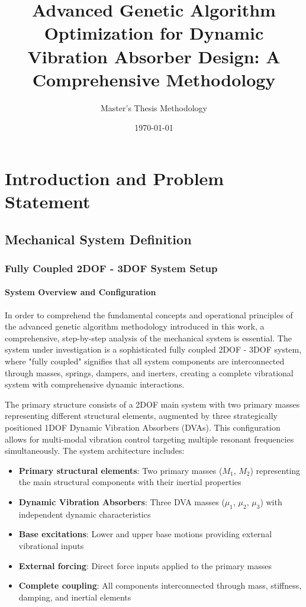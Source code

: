 \documentclass[12pt,a4paper]{article}
\title{Advanced Genetic Algorithm Optimization for Dynamic Vibration Absorber Design: A Comprehensive Methodology}
\author{Master's Thesis Methodology}
\date{\today}
\begin{document}
\maketitle

\tableofcontents
\newpage

\section{Introduction and Problem Statement}

\subsection{Mechanical System Definition}

\subsubsection{Fully Coupled 2DOF - 3DOF System Setup}
\paragraph{System Overview and Configuration}

In order to comprehend the fundamental concepts and operational principles of the advanced genetic algorithm methodology introduced in this work, a comprehensive, step-by-step analysis of the mechanical system is essential. The system under investigation is a sophisticated fully coupled 2DOF - 3DOF system, where "fully coupled" signifies that all system components are interconnected through masses, springs, dampers, and inerters, creating a complete vibrational system with comprehensive dynamic interactions.

The primary structure consists of a 2DOF main system with two primary masses representing different structural elements, augmented by three strategically positioned 1DOF Dynamic Vibration Absorbers (DVAs). This configuration allows for multi-modal vibration control targeting multiple resonant frequencies simultaneously. The system architecture includes:

\begin{itemize}
    \item \textbf{Primary structural elements}: Two primary masses ($M_1$, $M_2$) representing the main structural components with their inertial properties
    \item \textbf{Dynamic Vibration Absorbers}: Three DVA masses ($\mu_1$, $\mu_2$, $\mu_3$) with independent dynamic characteristics
    \item \textbf{Base excitations}: Lower and upper base motions providing external vibrational inputs
    \item \textbf{External forcing}: Direct force inputs applied to the primary masses
    \item \textbf{Complete coupling}: All components interconnected through mass, stiffness, damping, and inertial elements
\end{itemize}
\end{document}
